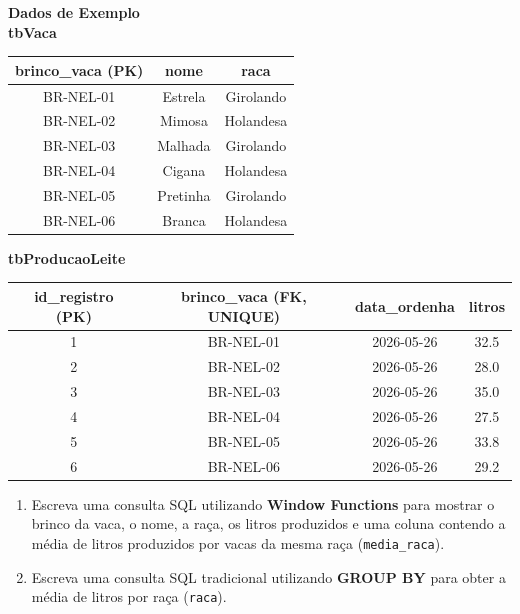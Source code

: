 \documentclass[12pt,a4paper]{article}
\newcommand{\resposta}[1]{}
\begin{document}
\begin{enumerate}[label=\textbf{Exercício \arabic* -}, leftmargin=*, itemsep=2.5em]
\begin{center}
    \textbf{Dados de Exemplo} \\[0.2cm]
    \textbf{tbVaca} \\[0.1cm]
    \begin{tabular}{|c|c|c|}
        \hline
        \textbf{brinco\_vaca (PK)} & \textbf{nome} & \textbf{raca} \\
        \hline
        BR-NEL-01 & Estrela & Girolando \\
        BR-NEL-02 & Mimosa & Holandesa \\
        BR-NEL-03 & Malhada & Girolando \\
        BR-NEL-04 & Cigana & Holandesa \\
        BR-NEL-05 & Pretinha & Girolando \\
        BR-NEL-06 & Branca & Holandesa \\
        \hline
    \end{tabular}
    \vspace{0.2cm}
    
    \textbf{tbProducaoLeite} \\[0.1cm]
    \begin{tabular}{|c|c|c|c|}
        \hline
        \textbf{id\_registro (PK)} & \textbf{brinco\_vaca (FK, UNIQUE)} & \textbf{data\_ordenha} & \textbf{litros} \\
        \hline
        1 & BR-NEL-01 & 2026-05-26 & 32.5 \\
        2 & BR-NEL-02 & 2026-05-26 & 28.0 \\
        3 & BR-NEL-03 & 2026-05-26 & 35.0 \\
        4 & BR-NEL-04 & 2026-05-26 & 27.5 \\
        5 & BR-NEL-05 & 2026-05-26 & 33.8 \\
        6 & BR-NEL-06 & 2026-05-26 & 29.2 \\
        \hline
    \end{tabular}
\end{center}

\begin{enumerate}[label=\textbf{\alph*)}]
    \item Escreva uma consulta SQL utilizando \textbf{Window Functions} para mostrar o brinco da vaca, o nome, a raça, os litros produzidos e uma coluna contendo a média de litros produzidos por vacas da mesma raça (\texttt{media\_raca}).
    \resposta{3cm}

    \item Escreva uma consulta SQL tradicional utilizando \textbf{GROUP BY} para obter a média de litros por raça (\texttt{raca}).
    \resposta{2cm}


\end{enumerate}
\end{enumerate}
\end{document}
